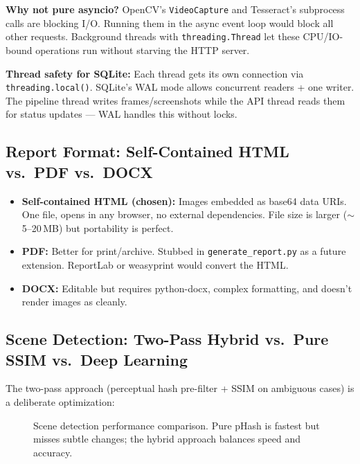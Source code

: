 \documentclass[12pt, a4paper]{article}
\newcommand{\codeinline}[1]{\texttt{\small\colorbox{codebg}{#1}}}
\newcommand{\filepath}[1]{\texttt{\small #1}}
\begin{document}
\textbf{Why not pure asyncio?} OpenCV's \codeinline{VideoCapture} and Tesseract's subprocess calls are blocking I/O. Running them in the async event loop would block all other requests. Background threads with \codeinline{threading.Thread} let these CPU/IO-bound operations run without starving the HTTP server.

\textbf{Thread safety for SQLite:} Each thread gets its own connection via \codeinline{threading.local()}. SQLite's WAL mode allows concurrent readers + one writer. The pipeline thread writes frames/screenshots while the API thread reads them for status updates --- WAL handles this without locks.

\subsection{Report Format: Self-Contained HTML vs.\ PDF vs.\ DOCX}

\begin{itemize}
    \item \textbf{Self-contained HTML (chosen):} Images embedded as base64 data URIs. One file, opens in any browser, no external dependencies. File size is larger ($\sim$5--20\,MB) but portability is perfect.
    \item \textbf{PDF:} Better for print/archive. Stubbed in \filepath{generate\_report.py} as a future extension. ReportLab or weasyprint would convert the HTML.
    \item \textbf{DOCX:} Editable but requires python-docx, complex formatting, and doesn't render images as cleanly.
\end{itemize}

\subsection{Scene Detection: Two-Pass Hybrid vs.\ Pure SSIM vs.\ Deep Learning}

The two-pass approach (perceptual hash pre-filter + SSIM on ambiguous cases) is a deliberate optimization:

\begin{figure}[H]
\centering
{}
\caption{Scene detection performance comparison. Pure pHash is fastest but misses subtle changes; the hybrid approach balances speed and accuracy.}
\end{figure}
\end{document}
